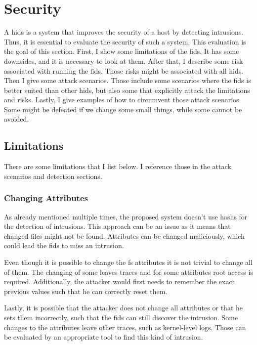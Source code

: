 
\section{Security}
\label{sec:Security}

A \gls{hids} is a system that improves the security of a host by detecting \glspl{intrusion}. Thus, it is essential to evaluate the security of such a system. This evaluation is the goal of this section. First, I show some limitations of the \gls{fids}. It has some downsides, and it is necessary to look at them. After that, I describe some risk associated with running the \gls{fids}. Those risks might be associated with all \gls{hids}. Then I give some attack scenarios. Those include some scenarios where the \gls{fids} is better suited than other \gls{hids}, but also some that explicitly attack the limitations and risks. Lastly, I give examples of how to circumvent those attack scenarios. Some might be defeated if we change some small things, while some cannot be avoided.

\subsection{Limitations}
\label{sec:Limitations}

There are some limitations that I list below. I reference those in the attack scenarios and detection sections.

\subsubsection{Changing Attributes}
\label{sec:limitation:chattr}

As already mentioned multiple times, the proposed system doesn't use \glspl{hash} for the detection of \glspl{intrusion}. This approach can be an issue as it means that changed files might not be found. Attributes can be changed maliciously, which could lead the \gls{fids} to miss an \gls{intrusion}.  \cite{chaning:times, changing:attributes}

Even though it is possible to change the \gls{fs} attributes it is not trivial to change all of them. The changing of some leaves traces and for some attributes root access is required. Additionally, the attacker would first needs to remember the exact previous values such that he can correctly reset them.  \cite{chaning:times, changing:attributes}

Lastly, it is possible that the attacker does not change all attributes or that he sets them incorrectly, such that the \gls{fids} can still discover the \gls{intrusion}. Some changes to the attributes leave other traces, such as kernel-level logs. Those can be evaluated by an appropriate tool to find this kind of \gls{intrusion}.

